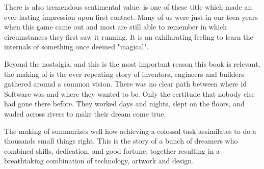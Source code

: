  \par
There is also tremendous sentimental value. \doom{} is one of these title which made an ever-lasting impression upon first contact. Many of us were just in our teen years when this game came out and most are still able to remember in which circumstances they first saw it running. It is an exhilarating feeling to learn the internals of something once deemed "magical".\\
\par


Beyond the nostalgia, and this is the most important reason this book is relevant, the making of \doom{} is the ever repeating story of inventors, engineers and builders gathered around a common vision. There was no clear path between where id Software was and where they wanted to be. Only the certitude that nobody else had gone there before. They worked days and nights, slept on the floors, and waded across rivers to make their dream come true.\\
\par
 The making of \doom{} summarizes well how achieving a colossal task assimilates to do a thousands small things right. This is the story of a bunch of dreamers who combined skills, dedication, and good fortune, together resulting in a breathtaking combination of technology, artwork and design.\\
\par



